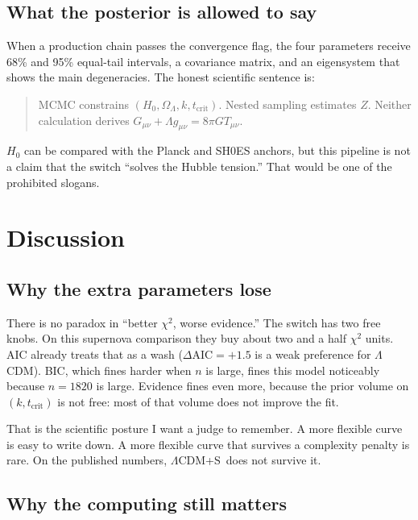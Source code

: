 \documentclass[12pt,letterpaper]{article}
\newcommand{\Lcdms}{$\Lambda$CDM+S}
\newcommand{\tcrit}{t_{\mathrm{crit}}}
\begin{document}
\subsection{What the posterior is allowed to say}

When a production chain passes the convergence flag, the four
parameters receive 68\% and 95\% equal-tail intervals, a covariance
matrix, and an eigensystem that shows the main degeneracies. The
honest scientific sentence is:

\begin{quote}
MCMC constrains $(H_0,\Omega_\Lambda,k,\tcrit)$. Nested sampling
estimates $Z$. Neither calculation derives
$G_{\mu\nu}+\Lambda g_{\mu\nu}=8\pi G T_{\mu\nu}$.
\end{quote}

$H_0$ can be compared with the Planck and SH0ES anchors, but this
pipeline is not a claim that the switch ``solves the Hubble tension.''
That would be one of the prohibited slogans.

\section{Discussion}

\subsection{Why the extra parameters lose}

There is no paradox in ``better $\chi^2$, worse evidence.'' The switch
has two free knobs. On this supernova comparison they buy about two
and a half $\chi^2$ units. AIC already treats that as a wash
($\Delta\mathrm{AIC}=+1.5$ is a weak preference for $\Lambda$CDM).
BIC, which fines harder when $n$ is large, fines this model
noticeably because $n=1820$ is large. Evidence fines even more,
because the prior volume on $(k,\tcrit)$ is not free: most of that
volume does not improve the fit.

That is the scientific posture I want a judge to remember. A more
flexible curve is easy to write down. A more flexible curve that
survives a complexity penalty is rare. On the published numbers,
\Lcdms\ does not survive it.

\subsection{Why the computing still matters}
\end{document}
